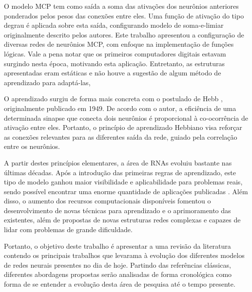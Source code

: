 \documentclass[conference]{IEEEtran}
\begin{document}
	O modelo MCP tem como saída a soma das ativações dos neurônios anteriores ponderados pelos pesos das conexões entre eles. Uma função de ativação do tipo degrau é aplicada sobre esta saída, configurando modelo de soma-e-limiar originalmente descrito pelos autores. Este trabalho apresentou a configuração de diversas redes de neurônios MCP, com enfoque na implementação de funções lógicas. Vale a pena notar que os primeiros computadores digitais estavam surgindo nesta época, motivando esta aplicação. Entretanto, as estruturas apresentadas eram estáticas e não houve a sugestão de algum método de aprendizado para adaptá-las,
	
	O aprendizado surgiu de forma mais concreta com o postulado de Hebb \cite{hebb2005organization}, originalmente publicado em 1949. De acordo com o autor, a eficiência de uma determinada sinapse que conecta dois neurônios é proporcional à co-ocorrência de ativação entre eles. Portanto, o princípio de aprendizado Hebbiano visa reforçar as conexões relevantes para as diferentes saída da rede, guiado pela correlação entre os neurônios. 
	
	A partir destes princípios elementares, a área de RNAs evoluiu bastante nas últimas décadas. Após a introdução das primeiras regras de aprendizado, este tipo de modelo ganhou maior visibilidade e aplicabilidade para problemas reais, sendo possível encontrar uma enorme quantidade de aplicações publicadas \cite{abiodun2018state}. Além disso, o aumento dos recursos computacionais disponíveis fomentou o desenvolvimento de novas técnicas para aprendizado e o aprimoramento das existentes, além de propostas de novas estruturas redes complexas e capazes de lidar com problemas de grande dificuldade.
	
	Portanto, o objetivo deste trabalho é apresentar a uma revisão da literatura contendo os principais trabalhos que levarama à evolução dos diferentes modelos de redes neurais presentes no dia de hoje. Partindo das referências clássicas, diferentes abordagens propostas serão analisadas de forma cronológica como forma de se entender a evolução desta área de pesquisa até o tempo presente. 
		
	
\end{document}

